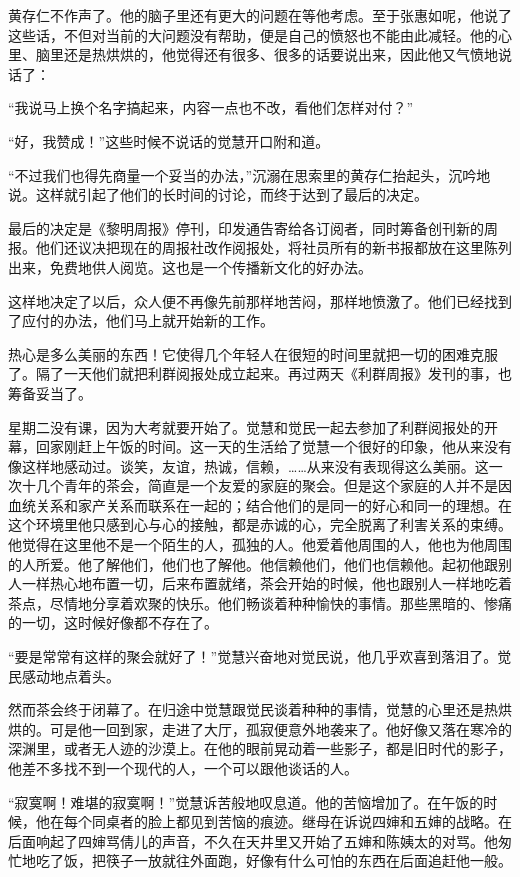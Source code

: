 \par 黄存仁不作声了。他的脑子里还有更大的问题在等他考虑。至于张惠如呢，他说了这些话，不但对当前的大问题没有帮助，便是自己的愤怒也不能由此减轻。他的心里、脑里还是热烘烘的，他觉得还有很多、很多的话要说出来，因此他又气愤地说话了：
\par “我说马上换个名字搞起来，内容一点也不改，看他们怎样对付？”
\par “好，我赞成！”这些时候不说话的觉慧开口附和道。
\par “不过我们也得先商量一个妥当的办法，”沉溺在思索里的黄存仁抬起头，沉吟地说。这样就引起了他们的长时间的讨论，而终于达到了最后的决定。
\par 最后的决定是《黎明周报》停刊，印发通告寄给各订阅者，同时筹备创刊新的周报。他们还议决把现在的周报社改作阅报处，将社员所有的新书报都放在这里陈列出来，免费地供人阅览。这也是一个传播新文化的好办法。
\par 这样地决定了以后，众人便不再像先前那样地苦闷，那样地愤激了。他们已经找到了应付的办法，他们马上就开始新的工作。
\par 热心是多么美丽的东西！它使得几个年轻人在很短的时间里就把一切的困难克服了。隔了一天他们就把利群阅报处成立起来。再过两天《利群周报》发刊的事，也筹备妥当了。
\par 星期二没有课，因为大考就要开始了。觉慧和觉民一起去参加了利群阅报处的开幕，回家刚赶上午饭的时间。这一天的生活给了觉慧一个很好的印象，他从来没有像这样地感动过。谈笑，友谊，热诚，信赖，……从来没有表现得这么美丽。这一次十几个青年的茶会，简直是一个友爱的家庭的聚会。但是这个家庭的人并不是因血统关系和家产关系而联系在一起的；结合他们的是同一的好心和同一的理想。在这个环境里他只感到心与心的接触，都是赤诚的心，完全脱离了利害关系的束缚。他觉得在这里他不是一个陌生的人，孤独的人。他爱着他周围的人，他也为他周围的人所爱。他了解他们，他们也了解他。他信赖他们，他们也信赖他。起初他跟别人一样热心地布置一切，后来布置就绪，茶会开始的时候，他也跟别人一样地吃着茶点，尽情地分享着欢聚的快乐。他们畅谈着种种愉快的事情。那些黑暗的、惨痛的一切，这时候好像都不存在了。
\par “要是常常有这样的聚会就好了！”觉慧兴奋地对觉民说，他几乎欢喜到落泪了。觉民感动地点着头。
\par 然而茶会终于闭幕了。在归途中觉慧跟觉民谈着种种的事情，觉慧的心里还是热烘烘的。可是他一回到家，走进了大厅，孤寂便意外地袭来了。他好像又落在寒冷的深渊里，或者无人迹的沙漠上。在他的眼前晃动着一些影子，都是旧时代的影子，他差不多找不到一个现代的人，一个可以跟他谈话的人。
\par “寂寞啊！难堪的寂寞啊！”觉慧诉苦般地叹息道。他的苦恼增加了。在午饭的时候，他在每个同桌者的脸上都见到苦恼的痕迹。继母在诉说四婶和五婶的战略。在后面响起了四婶骂倩儿的声音，不久在天井里又开始了五婶和陈姨太的对骂。他匆忙地吃了饭，把筷子一放就往外面跑，好像有什么可怕的东西在后面追赶他一般。
